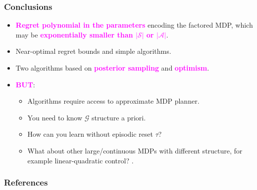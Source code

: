 \documentclass{beamer}
\newlength{\wideitemsep}
\let\olditem\item
\renewcommand{\item}{\setlength{\itemsep}{\wideitemsep}\olditem}
\newcommand{\Gc}{\mathcal{G}}
\newcommand{\Sc}{\mathcal{S}}
\newcommand{\Ac}{\mathcal{A}}
\newcommand{\bspace}{\vspace{3mm}}
\newcommand{\hilite}[1]{\textcolor{magenta}{\textbf{#1}}}
\begin{document}
\begin{frame}
\frametitle{Conclusions}
\begin{itemize}
    \item \hilite{Regret polynomial in the parameters} encoding the factored MDP, which may be \hilite{exponentially smaller than $|\Sc|$ or $|\Ac|$}.
    \bspace
    \item Near-optimal regret bounds and simple algorithms.
    \bspace
    \item Two algorithms based on \hilite{posterior sampling} and \hilite{optimism}.
    \bspace
    \pause
    \item \hilite{BUT}:
    \begin{itemize}
        \item Algorithms require access to approximate MDP planner.
        \item You need to know $\Gc$ structure a priori.
        \item How can you learn without episodic reset $\tau$?
        \item What about other large/continuous MDPs with different structure, for example linear-quadratic control? \cite{osband2014model}.
    \end{itemize}
\end{itemize}
\end{frame}


\begin{frame}
\frametitle{References}
\tiny{


}
\end{frame}
\end{document}
